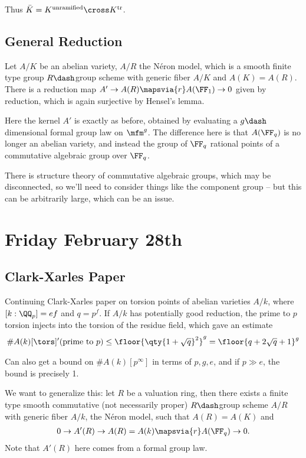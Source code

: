 Thus \(\bar K = K^{\text{unramified}} \cross K^{\text{tr}}\).

\hypertarget{general-reduction}{%
\subsection{General Reduction}\label{general-reduction}}

Let \(A/K\) be an abelian variety, \(A/R\) the Néron model, which is a
smooth finite type group \(R\dash\)group scheme with generic fiber
\(A/K\) and \(A(K) = A(R)\). There is a reduction map
\(A' \to A(R) \mapsvia{r} A(\FF_1) \to 0\) given by reduction, which is
again surjective by Hensel's lemma.

Here the kernel \(A'\) is exactly as before, obtained by evaluating a
\(g\dash\)dimensional formal group law on \(\mfm^g\). The difference
here is that \(A(\FF_q)\) is no longer an abelian variety, and instead
the group of \(\FF_q\) rational points of a commutative algebraic group
over \(\FF_q\).

There is structure theory of commutative algebraic groups, which may be
disconnected, so we'll need to consider things like the component group
-- but this can be arbitrarily large, which can be an issue.

\hypertarget{friday-february-28th}{%
\section{Friday February 28th}\label{friday-february-28th}}

\hypertarget{clark-xarles-paper}{%
\subsection{Clark-Xarles Paper}\label{clark-xarles-paper}}

Continuing Clark-Xarles paper on torsion points of abelian varieties
\(A/k\), where \([k: \QQ_p] = ef\) and \(q = p^f\). If \(A/k\) has
potentially good reduction, the prime to \(p\) torsion injects into the
torsion of the residue field, which gave an estimate
\begin{align*}
\# A(k)[\tors]' \text{(prime to $p$)}
\leq 
\floor{ \qty{1 + \sqrt q  }^2  }^ g
= 
\floor{ q + 2\sqrt q + 1  }^ g
\end{align*}

Can also get a bound on \(\# A(k)[p^\infty]\) in terms of \(p, g, e\),
and if \(p \gg e\), the bound is precisely 1.

We want to generalize this: let \(R\) be a valuation ring, then there
exists a finite type smooth commutative (not necessarily proper)
\(R\dash\)group scheme \(A/R\) with generic fiber \(A/k\), the Néron
model, such that \(A(R) = A(K)\) and
\begin{align*}
0 \to A'(R) \to A(R) = A(k) \mapsvia{r} A(\FF_q) \to 0
.\end{align*} Note that \(A'(R)\) here comes from a formal group law.

